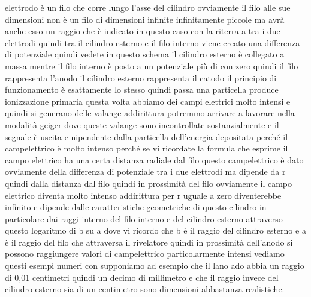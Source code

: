 {elettrodo è un filo che corre lungo l'asse del cilindro ovviamente il filo alle sue dimensioni non è un filo di dimensioni infinite infinitamente piccole ma avrà anche esso un raggio che è indicato in questo caso con la riterra a tra i due elettrodi quindi tra il cilindro esterno e il filo interno viene creato una differenza di potenziale quindi vedete in questo schema il cilindro esterno è collegato a massa mentre il filo interno è posto a un potenziale più di con zero quindi il filo rappresenta l'anodo il cilindro esterno rappresenta il catodo il principio di funzionamento è esattamente lo stesso quindi passa una particella produce ionizzazione primaria questa volta abbiamo dei campi elettrici molto intensi e quindi si generano delle valange addirittura potremmo arrivare a lavorare nella modalità geiger dove queste valange sono incontrollate sostanzialmente e il segnale è uscita e nipendente dalla particella dell'energia depositata perché il campelettrico è molto intenso perché se vi ricordate la formula che esprime il campo elettrico ha una certa distanza radiale dal filo questo campelettrico è dato ovviamente della differenza di potenziale tra i due elettrodi ma dipende da r quindi dalla distanza dal filo quindi in prossimità del filo ovviamente il campo elettrico diventa molto intenso addirittura per r uguale a zero diventerebbe infinito e dipende dalle caratteristiche geometriche di questo cilindro in particolare dai raggi interno del filo interno e del cilindro esterno attraverso questo logaritmo di b su a dove vi ricordo che b è il raggio del cilindro esterno e a è il raggio del filo che attraversa il rivelatore quindi in prossimità dell'anodo si possono raggiungere valori di campelettrico particolarmente intensi vediamo questi esempi numeri con supponiamo ad esempio che il lano ado abbia un raggio di 0,01 centimetri quindi un decimo di millimetro e che il raggio invece del cilindro esterno sia di un centimetro sono dimensioni abbastanza realistiche. 

}
